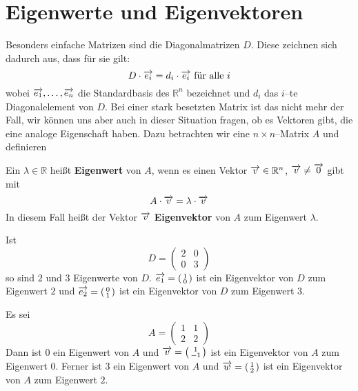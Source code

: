 \section{Eigenwerte und Eigenvektoren}\label{section_ew_evg}

\setcounter{definition}{0}
\setcounter{beispiel}{0}
\setcounter{notiz}{0}

Besonders einfache Matrizen sind die Diagonalmatrizen $D$. Diese zeichnen sich 
dadurch aus, dass für sie gilt:
  	$$ D \cdot \overrightarrow{e_i} = d_i \cdot \overrightarrow{e_i} 
  	\textrm{ für alle } i $$
wobei $\overrightarrow{e_1}, \ldots, \overrightarrow{e_n}$ die Standardbasis des 
$\mathbb R^n$ bezeichnet und $d_i$ das $i$--te Diagonalelement von $D$. Bei einer 
stark besetzten Matrix ist das nicht mehr der Fall, wir können uns aber auch in dieser 
Situation fragen, ob es Vektoren gibt, die eine analoge Eigenschaft haben. Dazu 
betrachten wir eine $n \times n$--Matrix $A$ und definieren 
  
\begin{definition} Ein $\lambda \in \mathbb R$ heißt 
\textbf{Eigenwert} von $A$, wenn es einen Vektor $\overrightarrow{v} 
\in \mathbb R^n$, $\overrightarrow{v} \neq \overrightarrow{0}$ gibt mit
  	$$ A \cdot \overrightarrow{v} = \lambda \cdot \overrightarrow{v} $$
In diesem Fall heißt der Vektor $\overrightarrow{v}$ 
\textbf{Eigenvektor} von $A$ zum Eigenwert $\lambda$.
\end{definition}

\begin{beispiel} Ist 
  	$$ D = \left( \begin{matrix} 2 & 0 \\ 0 & 3 \end{matrix} \right) $$
so sind $2$ und $3$ Eigenwerte von $D$. $\overrightarrow{e_1} = \left( 
\begin{smallmatrix} 1 \\ 0 \end{smallmatrix} \right)$ ist ein Eigenvektor von $D$  
zum Eigenwert $2$ und $\overrightarrow{e_2} = \left( 
\begin{smallmatrix} 0 \\ 1 \end{smallmatrix} \right)$ ist ein Eigenvektor von $D$  
zum Eigenwert $3$. 
\end{beispiel}

\begin{beispiel}\label{ew_ker_null} Es sei
  	$$ A = \left( \begin{matrix} 1 & 1 \\ 2 & 2 \end{matrix} \right) $$
Dann ist $0$ ein Eigenwert von $A$ und $\overrightarrow{v} = \left( 
\begin{smallmatrix} 1 \\ -1 \end{smallmatrix} \right)$ ist ein Eigenvektor von $A$  
zum Eigenwert $0$. Ferner ist
$3$ ein Eigenwert von $A$ und $\overrightarrow{w} = \left( 
\begin{smallmatrix} 1 \\ 2 \end{smallmatrix} \right)$ ist ein Eigenvektor von $A$  
zum Eigenwert $2$. 
\end{beispiel}

